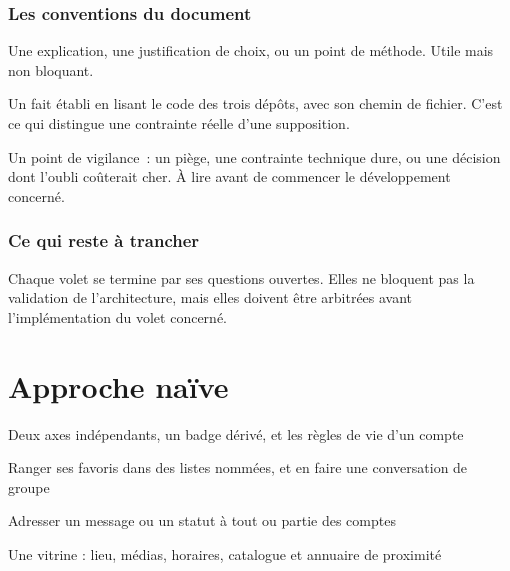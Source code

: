 \documentclass[11pt,a4paper,oneside]{report}
\begin{document}
\section*{Les conventions du document}

\begin{note}
Une explication, une justification de choix, ou un point de méthode. Utile mais non bloquant.
\end{note}

\begin{constat}
Un fait établi en lisant le code des trois dépôts, avec son chemin de fichier. C'est ce qui
distingue une contrainte réelle d'une supposition.
\end{constat}

\begin{alerte}
Un point de vigilance~: un piège, une contrainte technique dure, ou une décision dont
l'oubli coûterait cher. À lire avant de commencer le développement concerné.
\end{alerte}

\section*{Ce qui reste à trancher}

Chaque volet se termine par ses questions ouvertes. Elles ne bloquent pas la validation de
l'architecture, mais elles doivent être arbitrées avant l'implémentation du volet concerné.

\tableofcontents

\part{Approche naïve}

%
  {Deux axes indépendants, un badge dérivé, et les règles de vie d'un compte}


%
  {Ranger ses favoris dans des listes nommées, et en faire une conversation de groupe}


%
  {Adresser un message ou un statut à tout ou partie des comptes}


%
  {Une vitrine : lieu, médias, horaires, catalogue et annuaire de proximité}

\end{document}
